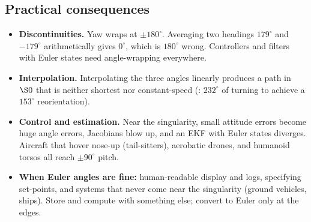 \subsection{Practical consequences}\label{sec:rot:practical-consequences}
\begin{itemize}
\item \textbf{Discontinuities.} Yaw wraps at $\pm180^\circ$. Averaging two headings $179^\circ$ and $-179^\circ$ arithmetically gives $0^\circ$, which is $180^\circ$ wrong. Controllers and filters with Euler states need angle-wrapping everywhere.
\item \textbf{Interpolation.} Interpolating the three angles linearly produces a path in $\SO$ that is neither shortest nor constant-speed (: $232^\circ$ of turning to achieve a $153^\circ$ reorientation).
\item \textbf{Control and estimation.} Near the singularity, small attitude errors become huge angle errors, Jacobians blow up, and an EKF with Euler states diverges. Aircraft that hover nose-up (tail-sitters), aerobatic drones, and humanoid torsos all reach $\pm90^\circ$ pitch.
\item \textbf{When Euler angles are fine:} human-readable display and logs, specifying set-points, and systems that never come near the singularity (ground vehicles, ships). Store and compute with something else; convert to Euler only at the edges.
\end{itemize}

